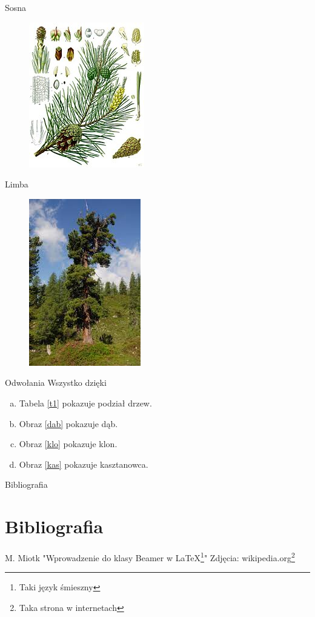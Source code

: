 \documentclass{beamer}
\begin{document}
\begin{frame}{Sosna}
\begin{figure}[h!]
\includegraphics[scale=0.7]{sos.jpg}
\end{figure}
\end{frame}

\begin{frame}{Limba}
\begin{figure}[h!]
\includegraphics[scale=0.6]{lim.jpg}
\end{figure}
\end{frame}

\begin{frame}{Odwołania}
Wszystko dzięki \cite{Miotk}
\begin{enumerate}[a)]
\item Tabela \ref{t1} pokazuje podział drzew.
\pause
\item Obraz \ref{dab} pokazuje dąb.
\pause
\item Obraz  \ref{klo} pokazuje klon.
\pause
\item Obraz \ref{kas} pokazuje kasztanowca.
\end{enumerate}
\end{frame}

\begin{frame}{Bibliografia}
\section{Bibliografia}\label{bb}
\begin{thebibliography}{2}
M. Miotk "Wprowadzenie do klasy Beamer w \LaTeX \footnote[1]{Taki język śmieszny}"
Zdjęcia: wikipedia.org\footnote[2]{Taka strona w internetach}
\end{thebibliography}
\end{frame}
\end{document}
